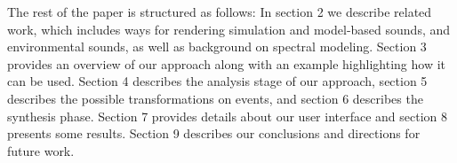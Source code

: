 \documentclass{acmsiggraph}               %
\begin{document}



The rest of the paper is structured as follows: In section 2 we describe 
related work, which includes ways for rendering simulation and 
model-based sounds, and environmental sounds, as well as background on 
spectral modeling. Section 3 provides an overview of our approach along  
with an example highlighting how it can be used. Section 4 describes the 
analysis stage of our approach, section 5 describes the possible 
transformations on events, and section 6 describes the synthesis phase. 
Section 7 provides details about our user interface and section 8 
presents some results. Section 9 describes our conclusions and 
directions for future work. 
\end{document}
